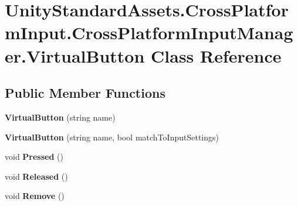 \hypertarget{class_unity_standard_assets_1_1_cross_platform_input_1_1_cross_platform_input_manager_1_1_virtual_button}{}\section{Unity\+Standard\+Assets.\+Cross\+Platform\+Input.\+Cross\+Platform\+Input\+Manager.\+Virtual\+Button Class Reference}
\label{class_unity_standard_assets_1_1_cross_platform_input_1_1_cross_platform_input_manager_1_1_virtual_button}
\subsection*{Public Member Functions}
\begin{DoxyCompactItemize}
\item 
\mbox{\label{class_unity_standard_assets_1_1_cross_platform_input_1_1_cross_platform_input_manager_1_1_virtual_button_a138a841bb53ba6eb68793aa15b677e09}} 
{\bfseries Virtual\+Button} (string name)
\item 
\mbox{\label{class_unity_standard_assets_1_1_cross_platform_input_1_1_cross_platform_input_manager_1_1_virtual_button_aee8ba0ad3aaf52e8609f0e321e69c4c1}} 
{\bfseries Virtual\+Button} (string name, bool match\+To\+Input\+Settings)
\item 
\mbox{\label{class_unity_standard_assets_1_1_cross_platform_input_1_1_cross_platform_input_manager_1_1_virtual_button_a286f1c4c3001579bf3268312620808e7}} 
void {\bfseries Pressed} ()
\item 
\mbox{\label{class_unity_standard_assets_1_1_cross_platform_input_1_1_cross_platform_input_manager_1_1_virtual_button_a0fc705bf079daeec58834c0eda4787ed}} 
void {\bfseries Released} ()
\item 
\mbox{\label{class_unity_standard_assets_1_1_cross_platform_input_1_1_cross_platform_input_manager_1_1_virtual_button_ac421e5de77f8384401a3e20d18101401}} 
void {\bfseries Remove} ()
\end{DoxyCompactItemize}
